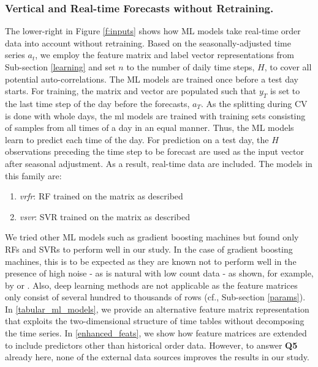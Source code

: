 \subsubsection{Vertical and Real-time Forecasts without Retraining.}
\label{ml_models}

The lower-right in Figure \ref{f:inputs} shows how ML models take
    real-time order data into account without retraining.
Based on the seasonally-adjusted time series $a_t$, we employ the feature
    matrix and label vector representations from Sub-section \ref{learning}
    and set $n$ to the number of daily time steps, $H$, to cover all potential
    auto-correlations.
The ML models are trained once before a test day starts.
For training, the matrix and vector are populated such that $y_T$ is set to
    the last time step of the day before the forecasts, $a_T$.
As the splitting during CV is done with whole days, the \gls{ml} models are
    trained with training sets consisting of samples from all times of a day
    in an equal manner.
Thus, the ML models learn to predict each time of the day.
For prediction on a test day, the $H$ observations preceding the time
    step to be forecast are used as the input vector after seasonal
    adjustment.
As a result, real-time data are included.
The models in this family are:
\begin{enumerate}
\item \textit{\gls{vrfr}}: RF trained on the matrix as described
\item \textit{\gls{vsvr}}: SVR trained on the matrix as described
\end{enumerate}
We tried other ML models such as gradient boosting machines but found
    only RFs and SVRs to perform well in our study.
In the case of gradient boosting machines, this is to be expected as they are
    known not to perform well in the presence of high noise - as is natural
    with low count data - as shown, for example, by \cite{ma2018} or
    \cite{mason2000}.
Also, deep learning methods are not applicable as the feature matrices only
    consist of several hundred to thousands of rows (cf., Sub-section
    \ref{params}).
In \ref{tabular_ml_models}, we provide an alternative feature matrix
    representation that exploits the two-dimensional structure of time tables
    without decomposing the time series.
In \ref{enhanced_feats}, we show how feature matrices are extended
    to include predictors other than historical order data.
However, to answer \textbf{Q5} already here, none of the external data sources
    improves the results in our study.
